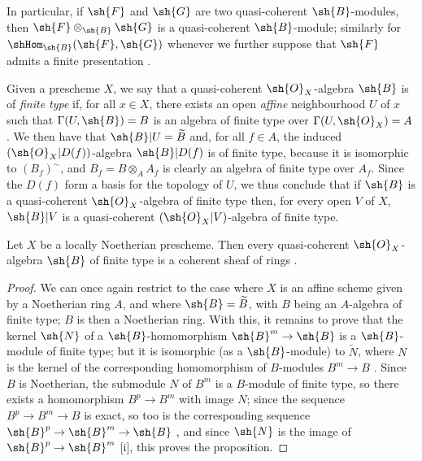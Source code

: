 In particular, if $\sh{F}$ and $\sh{G}$ are two quasi-coherent $\sh{B}$-modules, then $\sh{F}\otimes_{\sh{B}}\sh{G}$ is a quasi-coherent $\sh{B}$-module; similarly for $\shHom_{\sh{B}}(\sh{F},\sh{G})$ whenever we further suppose that $\sh{F}$ admits a finite presentation .

\begin{env}[9.6.2]
\label{I.9.6.2}
Given a prescheme $X$, we say that a quasi-coherent $\sh{O}_X$-algebra $\sh{B}$ is of \emph{finite type} if, for all $x\in X$, there exists an open \emph{affine} neighbourhood $U$ of $x$ such that $\Gamma(U,\sh{B})=B$ is an algebra of finite type over $\Gamma(U,\sh{O}_X)=A$.
We then have that $\sh{B}|U=\widetilde{B}$ and, for all $f\in A$, the induced $(\sh{O}_X|D(f))$-algebra $\sh{B}|D(f)$ is of finite type, because it is isomorphic to $(B_f)^{\sim}$, and $B_f=B\otimes_A A_f$ is clearly an algebra of finite type over $A_f$.
Since the $D(f)$ form a basis for the topology of $U$, we thus conclude that if $\sh{B}$ is a quasi-coherent $\sh{O}_X$-algebra of finite type then, for every open $V$ of $X$, $\sh{B}|V$ is a quasi-coherent $(\sh{O}_X|V)$-algebra of finite type.
\end{env}

\begin{proposition}[9.6.3]
\label{I.9.6.3}
Let $X$ be a locally Noetherian prescheme.
Then every quasi-coherent $\sh{O}_X$-algebra $\sh{B}$ of finite type is a coherent sheaf of rings .
\end{proposition}

\begin{proof}
We can once again restrict to the case where $X$ is an affine scheme given by a Noetherian ring $A$, and where $\sh{B}=\widetilde{B}$, with $B$ being an $A$-algebra of finite type; $B$ is then a Noetherian ring.
With this, it remains to prove that the kernel $\sh{N}$ of a $\sh{B}$-homomorphism $\sh{B}^m\to\sh{B}$ is a $\sh{B}$-
module of finite type; but it is isomorphic (as a $\sh{B}$-module) to $\widetilde{N}$, where $N$ is the kernel of the corresponding homomorphism of $B$-modules $B^m\to B$ .
Since $B$ is Noetherian, the submodule $N$ of $B^m$ is a $B$-module of finite type, so there exists a homomorphism $B^p\to B^m$ with image $N$; since the sequence $B^p\to B^m\to B$ is exact, so too is the corresponding sequence $\sh{B}^p\to\sh{B}^m\to\sh{B}$ , and since $\sh{N}$ is the image of $\sh{B}^p\to\sh{B}^m$ [i], this proves the proposition.
\end{proof}

